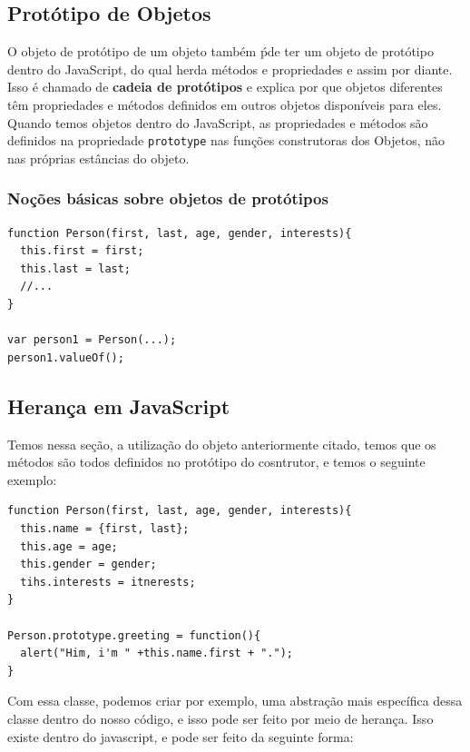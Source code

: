 \documentclass[12pt, a4paper]{paper}
\begin{document}
\subsection{Protótipo de Objetos} %
\label{sub:Protótipo de Objetos}
O objeto de protótipo de um objeto também ṕde ter um objeto de protótipo dentro do 
JavaScript, do qual herda métodos e propriedades e assim por diante. Isso é chamado de 
\textbf{cadeia de protótipos} e explica por que objetos diferentes têm propriedades 
e métodos definidos em outros objetos disponíveis para eles.
Quando temos objetos dentro do JavaScript, as propriedades e métodos são definidos na 
propriedade \texttt{prototype} nas funções construtoras dos Objetos, não nas próprias 
estâncias do objeto. 

\subsubsection{Noções básicas sobre objetos de protótipos} %
\label{sec:Noções básicas sobre objetos de protótipos}

\begin{verbatim}
function Person(first, last, age, gender, interests){
  this.first = first;
  this.last = last;
  //...
} 

var person1 = Person(...);
person1.valueOf();
\end{verbatim}


\subsection{Herança em JavaScript} %
\label{sub:Herança em JavaScript}
Temos nessa seção, a utilização do objeto anteriormente citado, temos que os métodos 
são todos definidos no protótipo do cosntrutor, e temos o seguinte exemplo:

\begin{verbatim}
function Person(first, last, age, gender, interests){
  this.name = {first, last};
  this.age = age;
  this.gender = gender; 
  tihs.interests = itnerests;
}

Person.prototype.greeting = function(){
  alert("Him, i'm " +this.name.first + ".");
}
\end{verbatim}

Com essa classe, podemos criar por exemplo, uma abstração mais específica dessa classe 
dentro do nosso código, e isso pode ser feito por meio de herança. Isso existe dentro 
do javascript, e pode ser feito da seguinte forma:
\end{document}

